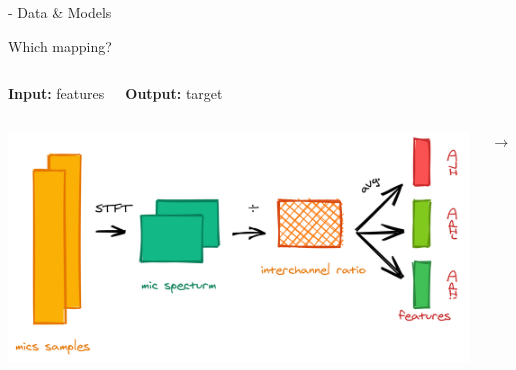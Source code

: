 \begin{frame}{\lantern - Data \& Models}

    \begin{block}{Which mapping?}
        \begin{columns}[onlytextwidth]
            \centering
            \textbf{Input:} features


            \centering
            \textbf{Output:} target
        \end{columns}

        \begin{columns}[onlytextwidth]
            \centering
            \includegraphics[width=\textwidth]{figures/lantern.png}

            $\longrightarrow$


\end{columns}
\end{block}
\end{frame}
